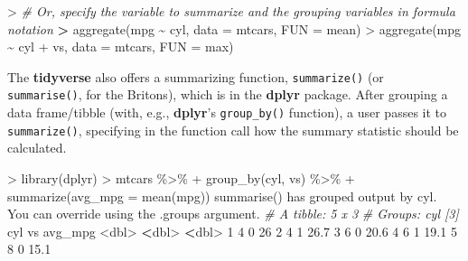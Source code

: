 \documentclass[
]{book}
\newenvironment{Shaded}{\begin{snugshade}}{\end{snugshade}}
\newcommand{\AttributeTok}[1]{\textcolor[rgb]{0.77,0.63,0.00}{#1}}
\newcommand{\CommentTok}[1]{\textcolor[rgb]{0.56,0.35,0.01}{\textit{#1}}}
\newcommand{\DecValTok}[1]{\textcolor[rgb]{0.00,0.00,0.81}{#1}}
\newcommand{\ErrorTok}[1]{\textcolor[rgb]{0.64,0.00,0.00}{\textbf{#1}}}
\newcommand{\FloatTok}[1]{\textcolor[rgb]{0.00,0.00,0.81}{#1}}
\newcommand{\FunctionTok}[1]{\textcolor[rgb]{0.00,0.00,0.00}{#1}}
\newcommand{\NormalTok}[1]{#1}
\newcommand{\SpecialCharTok}[1]{\textcolor[rgb]{0.00,0.00,0.00}{#1}}
\newcommand{\StringTok}[1]{\textcolor[rgb]{0.31,0.60,0.02}{#1}}
\begin{document}
\begin{Shaded}
\begin{Highlighting}[]
\SpecialCharTok{\textgreater{}} \CommentTok{\# Or, specify the variable to summarize and the grouping variables in formula notation}
\ErrorTok{\textgreater{}} \FunctionTok{aggregate}\NormalTok{(mpg }\SpecialCharTok{\textasciitilde{}}\NormalTok{ cyl, }\AttributeTok{data =}\NormalTok{ mtcars, }\AttributeTok{FUN =}\NormalTok{ mean)}
\SpecialCharTok{\textgreater{}} \FunctionTok{aggregate}\NormalTok{(mpg }\SpecialCharTok{\textasciitilde{}}\NormalTok{ cyl }\SpecialCharTok{+}\NormalTok{ vs, }\AttributeTok{data =}\NormalTok{ mtcars, }\AttributeTok{FUN =}\NormalTok{ max)}
\end{Highlighting}
\end{Shaded}

The \textbf{tidyverse} also offers a summarizing function, \texttt{summarize()} (or \texttt{summarise()}, for the Britons), which is in the \textbf{dplyr} package. After grouping a data frame/tibble (with, e.g., \textbf{dplyr}'s \texttt{group\_by()} function), a user passes it to \texttt{summarize()}, specifying in the function call how the summary statistic should be calculated.

\begin{Shaded}
\begin{Highlighting}[]
\SpecialCharTok{\textgreater{}} \FunctionTok{library}\NormalTok{(dplyr)}
\SpecialCharTok{\textgreater{}}\NormalTok{ mtcars }\SpecialCharTok{\%\textgreater{}\%} 
\SpecialCharTok{+}   \FunctionTok{group\_by}\NormalTok{(cyl, vs) }\SpecialCharTok{\%\textgreater{}\%} 
\SpecialCharTok{+}   \FunctionTok{summarize}\NormalTok{(}\AttributeTok{avg\_mpg =} \FunctionTok{mean}\NormalTok{(mpg))}
\StringTok{\textasciigrave{}}\AttributeTok{summarise()}\StringTok{\textasciigrave{}}\NormalTok{ has grouped output by }\StringTok{\textquotesingle{}cyl\textquotesingle{}}\NormalTok{. You can override using the }\StringTok{\textasciigrave{}}\AttributeTok{.groups}\StringTok{\textasciigrave{}}\NormalTok{ argument.}
\CommentTok{\# A tibble: 5 x 3}
\CommentTok{\# Groups:   cyl [3]}
\NormalTok{    cyl    vs avg\_mpg}
  \SpecialCharTok{\textless{}}\NormalTok{dbl}\SpecialCharTok{\textgreater{}} \ErrorTok{\textless{}}\NormalTok{dbl}\SpecialCharTok{\textgreater{}}   \ErrorTok{\textless{}}\NormalTok{dbl}\SpecialCharTok{\textgreater{}}
\DecValTok{1}     \DecValTok{4}     \DecValTok{0}    \DecValTok{26}  
\DecValTok{2}     \DecValTok{4}     \DecValTok{1}    \FloatTok{26.7}
\DecValTok{3}     \DecValTok{6}     \DecValTok{0}    \FloatTok{20.6}
\DecValTok{4}     \DecValTok{6}     \DecValTok{1}    \FloatTok{19.1}
\DecValTok{5}     \DecValTok{8}     \DecValTok{0}    \FloatTok{15.1}
\end{Highlighting}
\end{Shaded}
\end{document}
